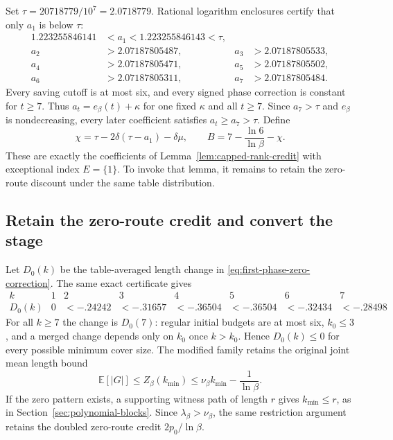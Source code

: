 Set $\tau=20718779/10^7=2.0718779$. Rational logarithm enclosures
certify that only $a_1$ is below $\tau$:
\begin{equation}\label{eq:first-phase-coefficient-certificate}
 \begin{aligned}
 1.223255846141&<a_1<1.223255846143<\tau,\\
 a_2&>2.07187805487,&a_3&>2.07187805533,\\
 a_4&>2.07187805471,&a_5&>2.07187805502,\\
 a_6&>2.07187805311,&a_7&>2.07187805484.
 \end{aligned}
\end{equation}
Every saving cutoff is at most six, and every signed phase correction
is constant for $t\ge7$. Thus $a_t=e_\beta(t)+\kappa$ for one fixed
$\kappa$ and all $t\ge7$. Since $a_7>\tau$ and $e_\beta$ is
nondecreasing, every later coefficient satisfies $a_t\ge a_7>\tau$.
Define
\begin{equation}\label{eq:first-phase-chi-B}
 \chi=\tau-2\delta(\tau-a_1)-\delta\mu,\qquad
 B=7-\frac{\ln6}{\ln\beta}-\chi.
\end{equation}
These are exactly the coefficients of
Lemma~\ref{lem:capped-rank-credit} with exceptional index $E=\{1\}$.
To invoke that lemma, it remains to retain the zero-route discount
under the same table distribution.

\subsection{Retain the zero-route credit and convert the stage}

Let $D_0(k)$ be the table-averaged length change in
\eqref{eq:first-phase-zero-correction}. The same exact certificate gives
\[
 \begin{array}{c|rrrrrrr}
 k&1&2&3&4&5&6&7\\\hline
 D_0(k)&0&<-.24242&<-.31657&<-.36504&<-.36504&<-.32434&<-.28498
 \end{array}
\]
For all $k\ge7$ the change is $D_0(7)$: regular initial budgets are
at most six, $k_0\le3$, and a merged change depends only on $k_0$
once $k>k_0$. Hence $D_0(k)\le0$ for every possible minimum cover
size. The modified family retains the original joint mean length bound
\[
 \mathbb E[|G|]\le Z_\beta(k_{\min})
 \le\nu_\beta k_{\min}-\frac1{\ln\beta}.
\]
If the zero pattern exists, a supporting witness path of length $r$
gives $k_{\min}\le r$, as in Section~\ref{sec:polynomial-blocks}.
Since $\lambda_\beta>\nu_\beta$, the same restriction argument
retains the doubled zero-route credit $2p_0/\ln\beta$.

